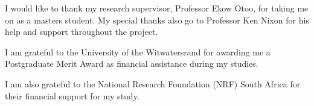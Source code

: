 
\begin{acknowledgements}
I would like to thank my research supervisor, Professor Ekow Otoo, for taking me on as a masters student. %
My special thanks also go to Professor Ken Nixon for his help and support throughout the project.

I am grateful to the University of the Witwatersrand for awarding me a Postgraduate Merit Award as financial assistance during my studies.

I am also grateful to the National Research Foundation (NRF) South Africa for their financial support for my study.
\end{acknowledgements}
